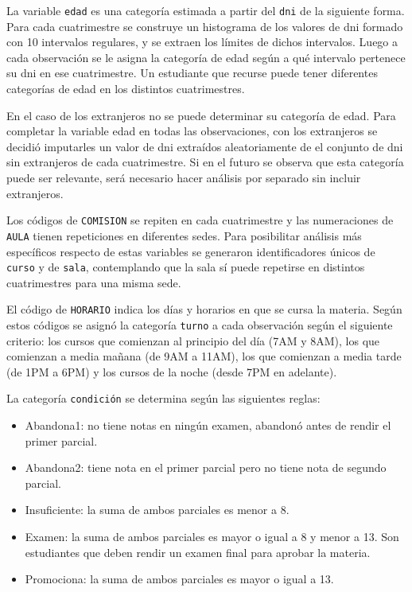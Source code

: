 \documentclass[a4paper,11pt,dvipsnames]{article}
\begin{document}
La variable \texttt{edad} es una categoría estimada a partir del \texttt{dni} de la siguiente forma. Para cada cuatrimestre se construye un histograma de los valores de dni formado con 10 intervalos regulares, y se extraen los límites de dichos intervalos. Luego a cada observación se le asigna la categoría de edad según a qué intervalo pertenece su dni en ese cuatrimestre. Un estudiante que recurse puede tener diferentes categorías de edad en los distintos cuatrimestres.\par\medskip

En el caso de los extranjeros no se puede determinar su categoría de edad. Para completar la variable edad en todas las observaciones, con los extranjeros se decidió imputarles un valor de dni extraídos aleatoriamente de el conjunto de dni sin extranjeros de cada cuatrimestre. Si en el futuro se observa que esta categoría puede ser relevante, será necesario hacer análisis por separado sin incluir extranjeros.\par\medskip

Los códigos de \texttt{COMISION} se repiten en cada cuatrimestre y las numeraciones de \texttt{AULA} tienen repeticiones en diferentes sedes. Para posibilitar análisis más específicos respecto de estas variables se generaron identificadores únicos de \texttt{curso} y de \texttt{sala}, contemplando que la sala sí puede repetirse en distintos cuatrimestres para una misma sede.\par\medskip

El código de \texttt{HORARIO} indica los días y horarios en que se cursa la materia. Según estos códigos se asignó la categoría \texttt{turno} a cada observación según el siguiente criterio: los cursos que comienzan al principio del día (7AM y 8AM), los que comienzan a media mañana (de 9AM a 11AM), los que comienzan a media tarde (de 1PM a 6PM) y los cursos de la noche (desde 7PM en adelante).\par\medskip

La categoría \texttt{condición} se determina según las siguientes reglas:
\begin{itemize}
    \item Abandona1: no tiene notas en ningún examen, abandonó antes de rendir el primer parcial.
    \item Abandona2: tiene nota en el primer parcial pero no tiene nota de segundo parcial.
    \item Insuficiente: la suma de ambos parciales es menor a 8.
    \item Examen: la suma de ambos parciales es mayor o igual a 8 y menor a 13. Son estudiantes que deben rendir un examen final para aprobar la materia.
    \item Promociona: la suma de ambos parciales es mayor o igual a 13.
\end{itemize}
\end{document}
